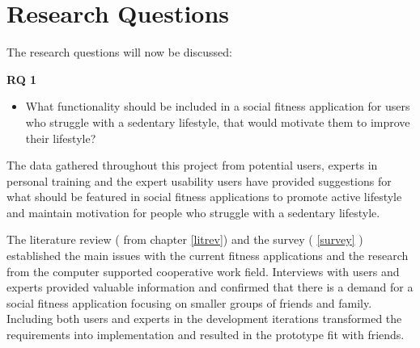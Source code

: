 \section{Research Questions} \label{researchQ}
The research questions will now be discussed:


\textbf{RQ 1}
\begin{itemize}
\item What functionality should be included in a social fitness application for users who struggle with a sedentary lifestyle, that would motivate them to improve their lifestyle? 
\end{itemize}
The data gathered throughout this project from potential users, experts in personal training and the expert usability users have provided suggestions for what should be featured in social fitness applications to promote active lifestyle and maintain motivation for people who struggle with a sedentary lifestyle.

The literature review ( from chapter \ref{litrev}) and the survey ( \ref{survey} ) established the main issues with the current fitness applications and the research from the computer supported cooperative work field. Interviews with users and experts provided valuable information and confirmed that there is a demand for a social fitness application focusing on smaller groups of friends and family. Including both users and experts in the development iterations transformed the requirements into implementation and resulted in the prototype fit with friends. 

